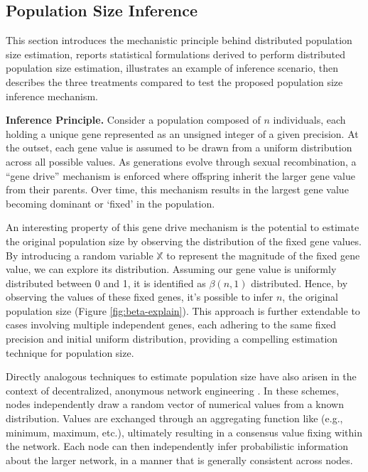 \subsection{Population Size Inference}
\label{sec:population-size-inference}

This section introduces the mechanistic principle behind distributed population size estimation, reports statistical formulations derived to perform distributed population size estimation, illustrates an example of inference scenario, then describes the three treatments compared to test the proposed population size inference mechanism.

\textbf{Inference Principle.}
Consider a population composed of $n$ individuals, each holding a unique gene represented as an unsigned integer of a given precision.
At the outset, each gene value is assumed to be drawn from a uniform distribution across all possible values.
As generations evolve through sexual recombination, a ``gene drive'' mechanism is enforced where offspring inherit the larger gene value from their parents.
Over time, this mechanism results in the largest gene value becoming dominant or `fixed' in the population.



An interesting property of this gene drive mechanism is the potential to estimate the original population size by observing the distribution of the fixed gene values.
By introducing a random variable $\mathbb{X}$ to represent the magnitude of the fixed gene value, we can explore its distribution.
Assuming our gene value is uniformly distributed between 0 and 1, it is identified as $\beta(n, 1)$ \citep{gentle2009computational} distributed.
Hence, by observing the values of these fixed genes, it's possible to infer $n$, the original population size (Figure \ref{fig:beta-explain}).
This approach is further extendable to cases involving multiple independent genes, each adhering to the same fixed precision and initial uniform distribution, providing a compelling estimation technique for population size.

Directly analogous techniques to estimate population size have also arisen in the context of decentralized, anonymous network engineering \citep{varagnolo2010distributed,hakan2012distributed}.
In these schemes, nodes independently draw a random vector of numerical values from a known distribution.
Values are exchanged through an aggregating function like (e.g., minimum, maximum, etc.), ultimately resulting in a consensus value fixing within the network.
Each node can then independently infer probabilistic information about the larger network, in a manner that is generally consistent across nodes.

